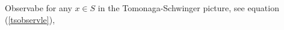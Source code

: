   \item [{$\hat{O}(x)$}]\begingroup Observabe for any $x\in S$ in the Tomonaga-Schwinger picture, see equation (\ref{tsobservle}), \nomrefpage{}